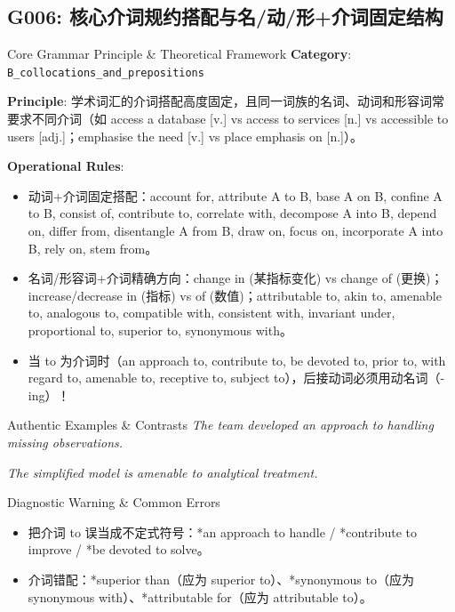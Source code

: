 \subsection{G006: 核心介词规约搭配与名/动/形+介词固定结构}\label{sec:rule:G006}
\begin{ConceptBox}{Core Grammar Principle \& Theoretical Framework}
\textbf{Category}: \texttt{B\_collocations\_and\_prepositions}\par\vspace{3pt}
\textbf{Principle}: 学术词汇的介词搭配高度固定，且同一词族的名词、动词和形容词常要求不同介词（如 access a database [v.] vs access to services [n.] vs accessible to users [adj.]；emphasise the need [v.] vs place emphasis on [n.]）。\par\vspace{4pt}
\textbf{Operational Rules}:
\begin{itemize}[leftmargin=1.5em, itemsep=1pt]
  \item 动词+介词固定搭配：account for, attribute A to B, base A on B, confine A to B, consist of, contribute to, correlate with, decompose A into B, depend on, differ from, disentangle A from B, draw on, focus on, incorporate A into B, rely on, stem from。
  \item 名词/形容词+介词精确方向：change in (某指标变化) vs change of (更换)；increase/decrease in (指标) vs of (数值)；attributable to, akin to, amenable to, analogous to, compatible with, consistent with, invariant under, proportional to, superior to, synonymous with。
  \item 当 to 为介词时（an approach to, contribute to, be devoted to, prior to, with regard to, amenable to, receptive to, subject to），后接动词必须用动名词（-ing）！
\end{itemize}
\end{ConceptBox}
\begin{ExampleBox}{Authentic Examples \& Contrasts}
\textit{The team developed an approach to handling missing observations.}\par\vspace{2pt}
\textit{The simplified model is amenable to analytical treatment.}\par\vspace{2pt}
\end{ExampleBox}
\begin{TipBox}{Diagnostic Warning \& Common Errors}
\begin{itemize}[leftmargin=1.5em, itemsep=1pt]
  \item 把介词 to 误当成不定式符号：*an approach to handle / *contribute to improve / *be devoted to solve。
  \item 介词错配：*superior than（应为 superior to）、*synonymous to（应为 synonymous with）、*attributable for（应为 attributable to）。
\end{itemize}
\end{TipBox}
\vspace{6pt}
